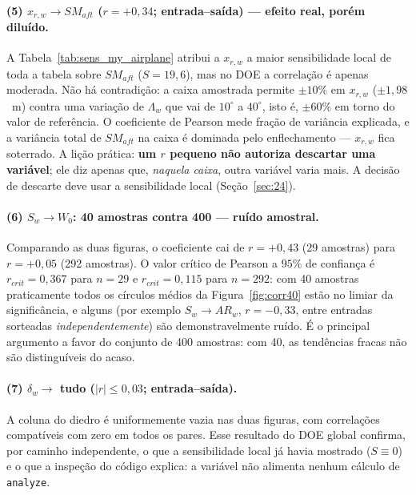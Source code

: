 \documentclass[11pt,a4paper]{article}
\newcommand{\code}[1]{\texttt{\small #1}}
\begin{document}
\paragraph{(5) $x_{r,w} \to SM_{aft}$ \; ($r = +0{,}34$; entrada--sa\'ida)
--- efeito real, por\'em dilu\'ido.}
A Tabela~\ref{tab:sens_my_airplane} atribui a $x_{r,w}$ a maior sensibilidade local de
toda a tabela sobre $SM_{aft}$ ($S = 19{,}6$), mas no DOE a correla\c{c}\~ao \'e
apenas moderada. N\~ao h\'a contradi\c{c}\~ao: a caixa amostrada permite
$\pm10\%$ em $x_{r,w}$ ($\pm 1{,}98$~m) contra uma varia\c{c}\~ao de
$\Lambda_w$ que vai de $10^\circ$ a $40^\circ$, isto \'e, $\pm 60\%$ em torno
do valor de refer\^encia. O coeficiente de Pearson mede fra\c{c}\~ao de
vari\^ancia explicada, e a vari\^ancia total de $SM_{aft}$ na caixa \'e
dominada pelo enflechamento --- $x_{r,w}$ fica soterrado. A li\c{c}\~ao
pr\'atica: \textbf{um $r$ pequeno n\~ao autoriza descartar uma vari\'avel}; ele
diz apenas que, \emph{naquela caixa}, outra vari\'avel varia mais. A decis\~ao
de descarte deve usar a sensibilidade local (Se\c{c}\~ao~\ref{sec:24}).

\paragraph{(6) $S_w \to W_0$: 40 amostras contra 400 --- ru\'ido amostral.}
Comparando as duas figuras, o coeficiente cai de $r = +0{,}43$ (29 amostras)
para $r = +0{,}05$ (292 amostras). O valor cr\'itico de Pearson a $95\%$ de
confian\c{c}a \'e $r_{crit} = 0{,}367$ para $n = 29$ e $r_{crit} = 0{,}115$
para $n = 292$: com 40 amostras praticamente todos os c\'irculos m\'edios da
Figura~\ref{fig:corr40} est\~ao no limiar da signific\^ancia, e alguns
(por exemplo $S_w \to AR_w$, $r = -0{,}33$, entre entradas sorteadas
\emph{independentemente}) s\~ao demonstravelmente ru\'ido. \'E o principal
argumento a favor do conjunto de 400 amostras: com 40, as tend\^encias fracas
n\~ao s\~ao distingu\'iveis do acaso.

\paragraph{(7) $\delta_w \to$ tudo \; ($|r| \le 0{,}03$; entrada--sa\'ida).}
A coluna do diedro \'e uniformemente vazia nas duas figuras, com correla\c{c}\~oes
compat\'iveis com zero em todos os pares. Esse resultado do DOE global
confirma, por caminho independente, o que a sensibilidade local j\'a havia
mostrado ($S \equiv 0$) e o que a inspe\c{c}\~ao do c\'odigo explica: a
vari\'avel n\~ao alimenta nenhum c\'alculo de \code{analyze}.
\end{document}

